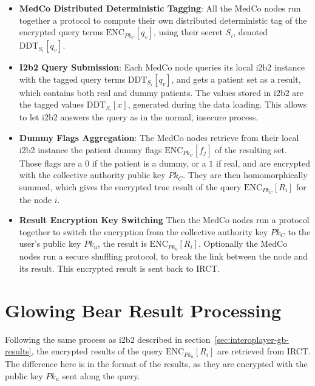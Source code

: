 \begin{itemize}

\item \textbf{MedCo Distributed Deterministic Tagging}:
All the MedCo nodes run together a protocol to compute their own distributed deterministic tag of the encrypted query terms $\text{ENC}_{Pk_C}[q_v]$, using their secret $S_i$, denoted $\text{DDT}_{S_i}[q_v]$.

\item \textbf{I2b2 Query Submission}:
Each MedCo node queries its local i2b2 instance with the tagged query terms $\text{DDT}_{S_i}[q_v]$, and gets a patient set as a result, which contains both real and dummy patients.
The values stored in i2b2 are the tagged values $\text{DDT}_{S_i}[x]$, generated during the data loading. 
This allows to let i2b2 answers the query as in the normal, insecure process.

\item \textbf{Dummy Flags Aggregation}:
The MedCo nodes retrieve from their local i2b2 instance the patient dummy flags $\text{ENC}_{Pk_C}[f_j]$ of the resulting set.
Those flags are a $0$ if the patient is a dummy, or a $1$ if real, and are encrypted with the collective authority public key $Pk_C$.
They are then homomorphically summed, which gives the encrypted true result of the query $\text{ENC}_{Pk_C}[R_i]$ for the node $i$.

\item \textbf{Result Encryption Key Switching}
Then the MedCo nodes run a protocol together to switch the encryption from the collective authority key $Pk_C$ to the user's public key $Pk_u$, the result is $\text{ENC}_{Pk_u}[R_i]$.
Optionally the MedCo nodes run a secure shuffling protocol, to break the link between the node and its result.
This encrypted result is sent back to IRCT.

\end{itemize}

\label{sec:medco-process}


\section{Glowing Bear Result Processing}

Following the same process as i2b2 described in section~\ref{sec:interoplayer-gb-results}, the encrypted results of the query $\text{ENC}_{Pk_u}[R_i]$ are retrieved from IRCT.
The difference here is in the format of the results, as they are encrypted with the public key $Pk_u$ sent along the query.


